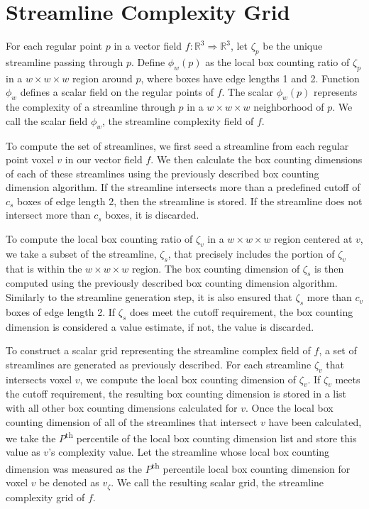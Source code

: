 \documentclass[journal]{vgtc}                %
\newcommand {\emath}[1]  {\ensuremath{#1}}
\newcommand {\Real}[1]   {\emath{\mathbb{R}^{#1}}}   %
\newcommand {\Rthree}    {\Real{3}}                  %
\newcommand {\gDim}[1]   {\emath{#1 \times #1 \times #1}} %
\begin{document}
\section{Streamline Complexity Grid} \label{sec:scg}

For each regular point $p$ in a vector field $f: \Rthree \Rightarrow \Rthree$,
let $\zeta_p$ be the unique streamline passing through $p$.
Define $\phi_w(p)$ as the local box counting ratio of $\zeta_p$
in a $\gDim{w}$ region around $p$,
where boxes have edge lengths 1 and 2.
Function $\phi_w$ defines a scalar field on the regular points of $f$.
The scalar $\phi_w(p)$ represents the complexity of a streamline through $p$ in a $\gDim{w}$ neighborhood of $p$.
We call the scalar field $\phi_w$, the streamline complexity field of $f$.

To compute the set of streamlines, we first seed a streamline from each regular point voxel $v$ in our vector field $f$.
We then calculate the box counting dimensions of each of these streamlines using the previously described box counting dimension algorithm.
If the streamline intersects more than a predefined cutoff of $c_s$ boxes of edge length 2, then the streamline is stored.
If the streamline does not intersect more than $c_s$ boxes, it is discarded.

To compute the local box counting ratio of $\zeta_v$ in a $\gDim{w}$ region centered at $v$, we take a subset of the streamline, $\zeta_s$, that precisely includes the portion of $\zeta_v$ that is within the $\gDim{w}$ region.
The box counting dimension of $\zeta_s$ is then computed using the previously described box counting dimension algorithm.
Similarly to the streamline generation step, it is also ensured that $\zeta_s$ more than $c_v$ boxes of edge length 2.
If $\zeta_s$ does meet the cutoff requirement, the box counting dimension is considered a value estimate, if not, the value is discarded.

To construct a scalar grid representing the streamline complex field of $f$, a set of streamlines are generated as previously described.
For each streamline $\zeta_v$ that intersects voxel $v$, we compute the local box counting dimension of $\zeta_v$.
If $\zeta_v$ meets the cutoff requirement, the resulting box counting dimension is stored in a list with all other box counting dimensions calculated for $v$.
Once the local box counting dimension of all of the streamlines that intersect $v$ have been calculated, we take the $P$\textsuperscript{th} percentile of the local box counting dimension list and store this value as $v$'s complexity value.
Let the streamline whose local box counting dimension was measured as the $P$\textsuperscript{th} percentile local box counting dimension for voxel $v$ be denoted as $v_\zeta$.
We call the resulting scalar grid, the streamline complexity grid of $f$.
\end{document}
